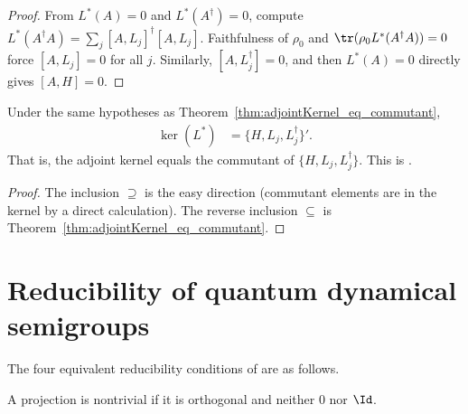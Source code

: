\begin{proof}
    \leanok
    From $L^*(A)=0$ and $L^*(A^\dagger)=0$, compute
    $L^*(A^\dagger A)=\sum_j[A,L_j]^\dagger[A,L_j]$.
    Faithfulness of $\rho_0$ and
    $\tr(\rho_0L^*(A^\dagger A))=0$
    force $[A,L_j]=0$ for all $j$.
    Similarly, $[A,L_j^\dagger]=0$, and then $L^*(A)=0$ directly gives
    $[A,H]=0$.
\end{proof}

\begin{theorem}
    \label{thm:adjointKernel_eq_commutant_full}
    \leanok
    Under the same hypotheses as
    Theorem~\ref{thm:adjointKernel_eq_commutant},
    \begin{align}
        \ker(L^*)
        &=\{H,L_j,L_j^\dagger\}'.
        \label{eq:semigroup_kernel_commutant}
    \end{align}
    That is, the adjoint kernel equals the commutant of
    $\{H,L_j,L_j^\dagger\}$.
    This is \cite[Theorem~7.2]{Wolf2012Quantum}.
\end{theorem}

\begin{proof}
    \leanok
    The inclusion $\supseteq$ is the easy direction
    (commutant elements are in the kernel by a direct calculation).
    The reverse inclusion $\subseteq$ is
    Theorem~\ref{thm:adjointKernel_eq_commutant}.
\end{proof}

\section{Reducibility of quantum dynamical semigroups}
\label{sec:qds_reducibility}


The four equivalent reducibility conditions of
\cite[Proposition~7.6]{Wolf2012Quantum} are as follows.

\begin{definition}
    \label{def:is_nontrivial_projection_ch12}
    \leanok
    A projection is nontrivial if it is orthogonal and neither $0$ nor $\Id$.
\end{definition}

